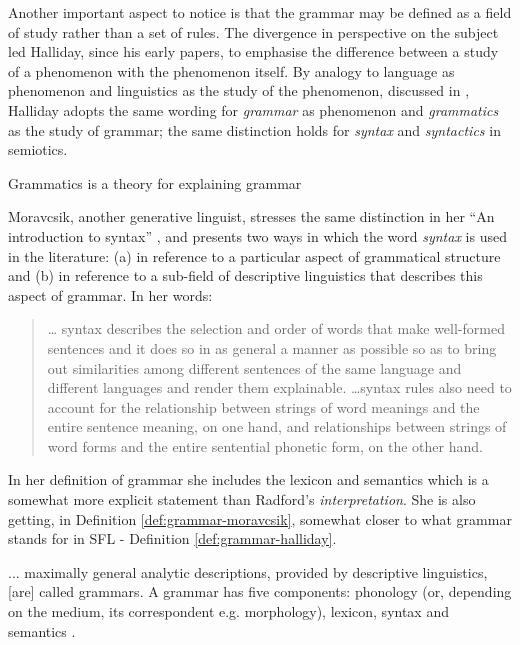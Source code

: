     Another important aspect to notice is that the grammar may be defined as a field of study rather than a set of rules. The divergence in perspective on the subject led Halliday, since his early papers, to emphasise the difference between a study of a phenomenon with the phenomenon itself. By analogy to language as phenomenon and linguistics as the study of the phenomenon, discussed in  \citep{Halliday1997-linguistics}, Halliday adopts the same wording for \textit{grammar} as phenomenon and \textit{grammatics} as the study of grammar; the same distinction holds for \textit{syntax} and \textit{syntactics} in semiotics.

    \begin{definition}\label{def:grammatics-halliday}
    	Grammatics is a theory for explaining grammar \citep[369]{Halliday2002}
    \end{definition}

    Moravcsik, another generative linguist, stresses the same distinction in her ``An introduction to syntax'' \citep{Moravcsik2006}, and presents two ways in which the word \textit{syntax} is used in the literature: (a) in reference to a particular aspect of grammatical structure and (b) in reference to a sub-field of descriptive linguistics that describes this aspect of grammar. 
    In her words: 

    \begin{quote}
    	\dots
    	syntax describes the selection and order of words that make well-formed sentences and it does so in as general a manner as possible so as to bring out similarities among different sentences of the same language and different languages and render them explainable. \dots syntax rules also need to account for the relationship between strings of word meanings and the entire sentence meaning, on one hand, and relationships between strings of word forms and the entire sentential phonetic form, on the other hand. \citep[25]{Moravcsik2006}	
    \end{quote}

    In her definition of grammar she includes the lexicon and semantics which is a somewhat more explicit statement than Radford's \textit{interpretation}. She is also getting, in Definition \ref{def:grammar-moravcsik}, somewhat closer to what grammar stands for in SFL - Definition \ref{def:grammar-halliday}. 
    
    \begin{definition}\label{def:grammar-moravcsik}
    ... maximally general analytic descriptions, provided by descriptive linguistics, [are] called grammars. A grammar has five components: phonology (or, depending on the medium, its correspondent e.g. morphology), lexicon, syntax and semantics \citep[24--25]{Moravcsik2006}. 
    \end{definition}
    
